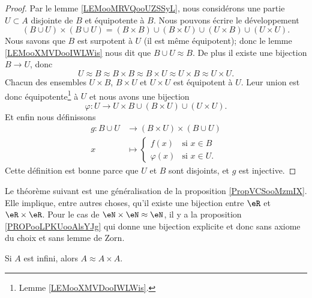 \begin{proof}
	Par le lemme \ref{LEMooMRVQooUZSSyL}, nous considérons une partie \( U\subset A\) disjointe de \( B\) et équipotente à \( B\). Nous pouvons écrire le développement
	\begin{equation}
		(B\cup U)\times (B\cup U)=(B\times B)\cup(B\times U)\cup (U\times B)\cup (U\times U).
	\end{equation}
	Nous savons que \( B\) est surpotent à \( U\) (il est même équipotent); donc le lemme \ref{LEMooXMVDooIWLWis} nous dit que \( B\cup U\approx B\). De plus il existe une bijection \( B\to U\), donc
	\begin{equation}
		U\approx B\approx B\times B\approx B\times U\approx U\times B\approx U\times U.
	\end{equation}
	Chacun des ensembles  \( U\times B\),  \( B\times U\) et \( U\times U\) est équipotent à \( U\). Leur union est donc équipotente\footnote{Lemme \ref{LEMooXMVDooIWLWis}.} à \( U\) et nous avons une bijection
	\begin{equation}
		\varphi\colon U\to U\times B\cup (B\times U)\cup (U\times U).
	\end{equation}
	Et enfin nous définissons
	\begin{equation}
		\begin{aligned}
			g\colon B\cup U & \to (B\times U)\times (B\cup U)         \\
			x               & \mapsto \begin{cases}
				                          f(x)       & \text{si }  x\in B \\
				                          \varphi(x) & \text{si } x\in U.
			                          \end{cases}
		\end{aligned}
	\end{equation}
	Cette définition est bonne parce que \( U\) et \( B\) sont disjoints, et \( g\) est injective.
\end{proof}

Le théorème suivant est une généralisation de la proposition \ref{PropVCSooMzmIX}. Elle implique, entre autres choses, qu'il existe une bijection entre \( \eR\) et \( \eR\times \eR\). Pour le cas de \( \eN\times \eN\approx \eN\), il y a la proposition \ref{PROPooLPKUooAlsYJg} qui donne une bijection explicite et donc sans axiome du choix et sans lemme de Zorn.
\begin{theorem}     \label{THOooDGOVooRdURVi}
	Si \( A\) est infini, alors \( A\approx A\times A\).
\end{theorem}

